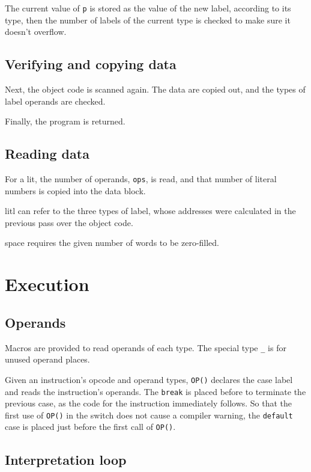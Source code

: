 \documentclass[english]{scrartcl}
\newcommand{\absfont}{\sffamily}
\newcommand{\abs}[1]{{\absfont #1}}
\begin{document}
The current value of \verb|p| is stored as the value of the new label, according
to its type, then the number of labels of the current type is checked to
make sure it doesn't overflow.


\subsection{Verifying and copying data}

Next, the object code is scanned again. The data are copied out, and
the types of label operands are checked.

Finally, the program is returned.


\subsection{Reading data}

For a \abs{lit}, the number of operands, \verb|ops|, is read, and that
number of literal numbers is copied into the data block.

\abs{litl} can refer to the three types of label, whose addresses were
calculated in the previous pass over the object code.

\abs{space} requires the given number of words to be zero-filled.



\section{Execution}

\subsection{Operands}

Macros are provided to read operands of each type. The special type
\verb|_| is for unused operand places.

Given an instruction's opcode and operand types, \verb|OP()| declares the
case label and reads the instruction's operands. The \verb|break| is placed
before to terminate the previous case, as the code for the instruction
immediately follows. So that the first use of \verb|OP()| in the switch does
not cause a compiler warning, the \verb|default| case is placed just before
the first call of \verb|OP()|.


\subsection{Interpretation loop}
\end{document}
